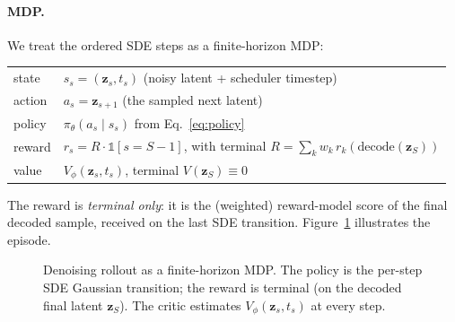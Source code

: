 \documentclass[11pt]{article}
\theoremstyle{plain}
\theoremstyle{remark}
\newcommand{\zt}{\bm{z}}
\begin{document}
\paragraph{MDP.}
We treat the ordered SDE steps as a finite-horizon MDP:
\begin{center}
\begin{tabular}{ll}
\toprule
state & $s_s = (\zt_s, t_s)$ (noisy latent + scheduler timestep)\\
action & $a_s = \zt_{s+1}$ (the sampled next latent)\\
policy & $\pi_\theta(a_s \mid s_s)$ from Eq.~\eqref{eq:policy}\\
reward & $r_s = R\cdot\mathbb{1}[s = S{-}1]$, with terminal $R=\sum_k w_k\, r_k(\text{decode}(\zt_S))$\\
value & $V_\phi(\zt_s, t_s)$, terminal $V(\zt_S)\equiv 0$\\
\bottomrule
\end{tabular}
\end{center}

The reward is \emph{terminal only}: it is the (weighted) reward-model score of the
final decoded sample, received on the last SDE transition. Figure~\ref{fig:mdp}
illustrates the episode.

\begin{figure}[h]
\centering
{}
\caption{Denoising rollout as a finite-horizon MDP. The policy is the per-step SDE
Gaussian transition; the reward is terminal (on the decoded final latent $\zt_S$).
The critic estimates $V_\phi(\zt_s,t_s)$ at every step.}
\label{fig:mdp}
\end{figure}
\end{document}
